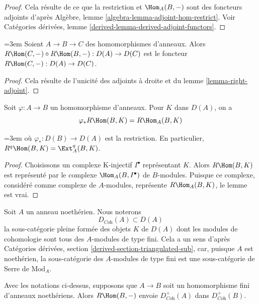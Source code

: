 \begin{proof}
Cela résulte de ce que la restriction et $\Hom_A(B, -)$ sont des foncteurs adjoints
d'après Algèbre, lemme \ref{algebra-lemma-adjoint-hom-restrict}.
Voir Catégories dérivées, lemme \ref{derived-lemma-derived-adjoint-functors}.
\end{proof}

\begin{lemma}
\label{lemma-composition-right-adjoints}
{\emergencystretch=3em Soient $A \to B \to C$ des homomorphismes d'anneaux. Alors
$R\Hom(C, -) \circ R\Hom(B, -) : D(A) \to D(C)$
est le foncteur $R\Hom(C, -) : D(A) \to D(C)$.\par}
\end{lemma}

\begin{proof}
Cela résulte de l'unicité des adjoints à droite et du lemme \ref{lemma-right-adjoint}.
\end{proof}

\begin{lemma}
\label{lemma-RHom-ext}
Soit $\varphi : A \to B$ un homomorphisme d'anneaux. Pour $K$ dans $D(A)$, on a
$$
\varphi_*R\Hom(B, K) = R\Hom_A(B, K)
$$
{\emergencystretch=3em où $\varphi_* : D(B) \to D(A)$ est la restriction. En particulier,
$R^q\Hom(B, K) = \Ext_A^q(B, K)$.\par}
\end{lemma}

\begin{proof}
Choisissons un complexe K-injectif $I^\bullet$ représentant $K$.
Alors $R\Hom(B, K)$ est représenté par le complexe $\Hom_A(B, I^\bullet)$ de $B$-modules.
Puisque ce complexe, considéré comme complexe de $A$-modules,
représente $R\Hom_A(B, K)$, le lemme est vrai.
\end{proof}

\noindent
Soit $A$ un anneau noethérien. Nous noterons
$$
D_{\textit{Coh}}(A) \subset D(A)
$$
la sous-catégorie pleine formée des objets $K$ de $D(A)$
dont les modules de cohomologie sont tous des $A$-modules de type fini.
Cela a un sens d'après Catégories dérivées, section \ref{derived-section-triangulated-sub},
car, puisque $A$ est noethérien, la sous-catégorie des
$A$-modules de type fini est une sous-catégorie de Serre de $\text{Mod}_A$.

\begin{lemma}
\label{lemma-exact-support-coherent}
Avec les notations ci-dessus, supposons que $A \to B$ soit un homomorphisme
fini d'anneaux noethériens. Alors $R\Hom(B, -)$ envoie $D^+_{\textit{Coh}}(A)$ dans $D^+_{\textit{Coh}}(B)$.
\end{lemma}

